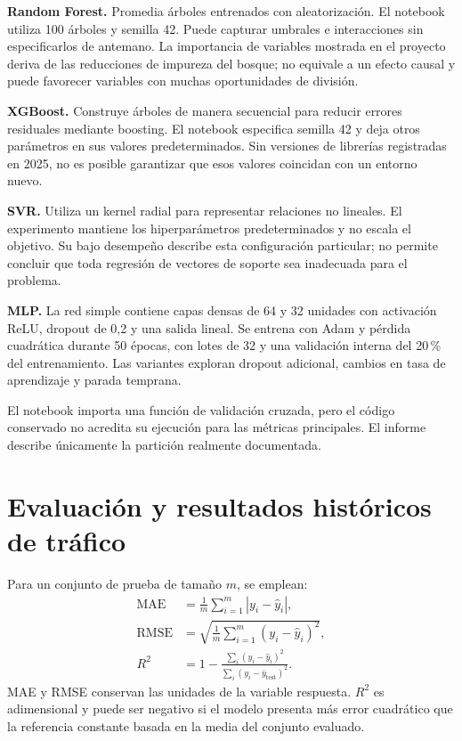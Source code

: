 \documentclass[11pt,a4paper]{article}
\begin{document}
\textbf{Random Forest.} Promedia árboles entrenados con aleatorización. El notebook utiliza 100 árboles y semilla 42. Puede capturar umbrales e interacciones sin especificarlos de antemano. La importancia de variables mostrada en el proyecto deriva de las reducciones de impureza del bosque; no equivale a un efecto causal y puede favorecer variables con muchas oportunidades de división.

\textbf{XGBoost.} Construye árboles de manera secuencial para reducir errores residuales mediante boosting. El notebook especifica semilla 42 y deja otros parámetros en sus valores predeterminados. Sin versiones de librerías registradas en 2025, no es posible garantizar que esos valores coincidan con un entorno nuevo.

\textbf{SVR.} Utiliza un kernel radial para representar relaciones no lineales. El experimento mantiene los hiperparámetros predeterminados y no escala el objetivo. Su bajo desempeño describe esta configuración particular; no permite concluir que toda regresión de vectores de soporte sea inadecuada para el problema.

\textbf{MLP.} La red simple contiene capas densas de 64 y 32 unidades con activación ReLU, dropout de 0,2 y una salida lineal. Se entrena con Adam y pérdida cuadrática durante 50 épocas, con lotes de 32 y una validación interna del 20\,\% del entrenamiento. Las variantes exploran dropout adicional, cambios en tasa de aprendizaje y parada temprana.

El notebook importa una función de validación cruzada, pero el código conservado no acredita su ejecución para las métricas principales. El informe describe únicamente la partición realmente documentada.
\par\medskip

\section{Evaluación y resultados históricos de tráfico}
Para un conjunto de prueba de tamaño $m$, se emplean:
\begin{align}
\operatorname{MAE}&=\frac1m\sum_{i=1}^{m}|y_i-\hat y_i|,\\
\operatorname{RMSE}&=\sqrt{\frac1m\sum_{i=1}^{m}(y_i-\hat y_i)^2},\\
R^2&=1-\frac{\sum_i(y_i-\hat y_i)^2}{\sum_i(y_i-\bar y_{\mathrm{test}})^2}.
\end{align}
MAE y RMSE conservan las unidades de la variable respuesta. $R^2$ es adimensional y puede ser negativo si el modelo presenta más error cuadrático que la referencia constante basada en la media del conjunto evaluado.
\end{document}
